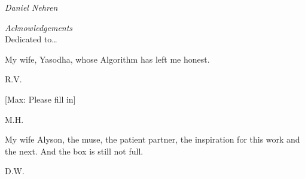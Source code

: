 {\noindent\large\itshape Daniel Nehren} \\[0.2cm]



\newpage



{\itshape \large Acknowledgements} \\

Dedicated to\dots \\

\begin{minipage}[t]{0.8\textwidth}
	\raggedright
  	My wife, Yasodha, whose Algorithm has left me honest. \par
  	\raggedleft
  	R.V.
\end{minipage} \vspace{1cm}


\begin{minipage}[t]{0.8\textwidth}
	\raggedright
  	[Max: Please fill in] \par
  	\raggedleft
  	M.H.
\end{minipage} \vspace{1cm}


\begin{minipage}[t]{0.8\textwidth}
	\raggedright
  	My wife Alyson, the muse, the patient partner, the inspiration for this work and the next. And the box is still not full. \par
  	\raggedleft
  	D.W.
\end{minipage} 


















